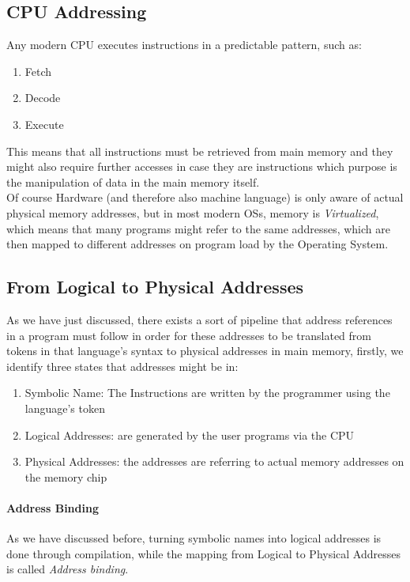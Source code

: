 \documentclass[openright, twoside]{report}
\theoremstyle{definition}
\theoremstyle{example}
\begin{document}
		\subsection{CPU Addressing}

		Any modern CPU executes instructions in a predictable pattern, such as:
		\begin{enumerate}
			\item Fetch 
			\item Decode 
			\item Execute
		\end{enumerate}

		This means that all instructions must be retrieved from main memory and they might also require further accesses in case 
		they are instructions which purpose is the manipulation of data in the main memory itself.\\


		Of course Hardware (and therefore also machine language) is only aware of actual physical memory addresses, but in most 
		modern OSs, memory is \emph{Virtualized}, which means that many programs might refer to the same addresses, which are then 
		mapped to different addresses on program load by the Operating System. 

		\subsection{From Logical to Physical Addresses}
		As we have just discussed, there exists a sort of pipeline that address references in a program must follow in order 
		for these addresses to be translated from tokens in that language's syntax to physical addresses in main memory,
		firstly, we identify three states that addresses might be in:

		\begin{enumerate}
			\item Symbolic Name: The Instructions are written by the programmer using the language's token
			\item Logical Addresses: are generated by the user programs via the CPU
			\item Physical Addresses: the addresses are referring to actual memory addresses on the memory chip
		\end{enumerate}
		
		\paragraph{Address Binding}
		As we have discussed before, turning symbolic names into logical addresses is done through compilation, while the 
		mapping from Logical to Physical Addresses is called \emph{Address binding}.
		
\end{document}
